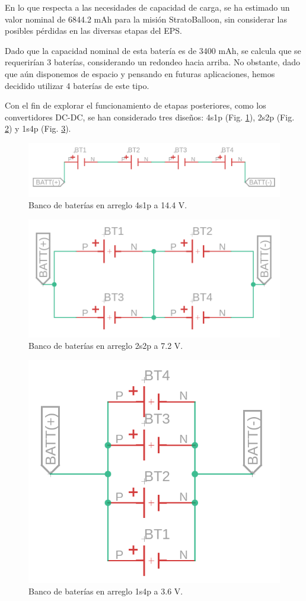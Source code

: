 En lo que respecta a las necesidades de capacidad de carga, se ha estimado un valor nominal de 6844.2 mAh para la misión StratoBalloon, sin considerar las posibles pérdidas en las diversas etapas del EPS.

Dado que la capacidad nominal de esta batería es de 3400 mAh, se calcula que se requerirían 3 baterías, considerando un redondeo hacia arriba. No obstante, dado que aún disponemos de espacio y pensando en futuras aplicaciones, hemos decidido utilizar 4 baterías de este tipo.

Con el fin de explorar el funcionamiento de etapas posteriores, como los convertidores DC-DC, se han considerado tres diseños: 4s1p (Fig. \ref{fig:powerbank}), 2s2p (Fig. \ref{fig:powerbank2}) y 1s4p (Fig. \ref{fig:powerbank3}).

\begin{figure}[h]
  \centering
  \includegraphics[width=0.7\linewidth]{Pictures/PowerBank.png} 
  \caption{Banco de baterías en arreglo 4s1p a 14.4 V.}
  \label{fig:powerbank}
\end{figure}

\begin{figure}[h]
  \centering
  \includegraphics[width=0.5\linewidth]{Pictures/Batteries2s2p.png} 
  \caption{Banco de baterías en arreglo 2s2p a 7.2 V.}
  \label{fig:powerbank2}
\end{figure}

\begin{figure}[h]
  \centering
  \includegraphics[width=0.4\linewidth]{Pictures/Batteries1s4p.png} 
  \caption{Banco de baterías en arreglo 1s4p a 3.6 V.}
  \label{fig:powerbank3}
\end{figure}

